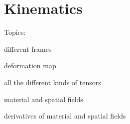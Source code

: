 \chapter{Kinematics}
\label{chapter:Kinematics}


Topics:

different frames

deformation map

all the different kinds of tensors

material and spatial fields

derivatives of material and spatial fields